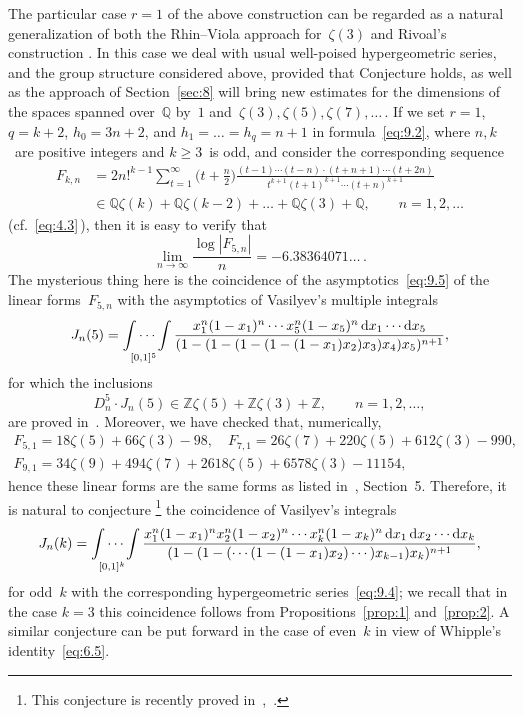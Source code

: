 \documentclass[a4paper,twoside]{article}
\numberwithin{equation}{section}
\renewcommand{\[}{\lfloor}
\renewcommand{\]}{\rfloor}
\newcommand{\<}{\langle}
\renewcommand{\>}{\rangle}
\renewcommand{\d}{\mathrm{d}}
\begin{document}
The particular case $r=1$ of the above construction
can be regarded as a natural generalization of both the Rhin--Viola
approach for~$\zeta(3)$ and Rivoal's construction \cite{Ri1}.
In this case we deal with usual well-poised hypergeometric series,
and the group structure considered above, provided that
Conjecture holds, as well as the approach of Section~\ref{sec:8}
will bring new estimates for the dimensions of the spaces
spanned over~$\mathbb Q$ by~$1$
and~$\zeta(3),\zeta(5),\zeta(7),\dots$\,.
If we set $r=1$, $q=k+2$, $h_0=3n+2$, and $h_1=\dots=h_q=n+1$
in formula~\eqref{eq:9.2}, where $n,k$~are positive
integers and $k\ge3$~is odd, and consider the corresponding
sequence
\begin{equation}
\begin{split}
F_{k,n}
&=2n!^{k-1}\sum_{t=1}^\infty\biggl(t+\frac n2\biggr)
\frac{(t-1)\dotsb(t-n)\cdot(t+n+1)\dotsb(t+2n)}
{t^{k+1}(t+1)^{k+1}\dotsb(t+n)^{k+1}}
\\
&\in\mathbb Q\zeta(k)+\mathbb Q\zeta(k-2)+\dots
+\mathbb Q\zeta(3)+\mathbb Q,
\qquad n=1,2,\dots
\end{split}
\label{eq:9.4}
\end{equation}
(cf.~\eqref{eq:4.3}\,), then it is easy to verify that
\begin{equation}
\lim_{n\to\infty}\frac{\log|F_{5,n}|}n
=-6.38364071\dots\,.
\label{eq:9.5}
\end{equation}
The mysterious thing here is the coincidence of the
asymptotics~\eqref{eq:9.5} of the linear forms~$F_{5,n}$
with the asymptotics of Vasilyev's multiple integrals
$$
J_n(5)=\idotsint\limits_{[0,1]^5}
\frac{x_1^n(1-x_1)^n\dotsb x_5^n(1-x_5)^n
\,\d x_1\dotsb\d x_5}
{(1-(1-(1-(1-(1-x_1)x_2)x_3)x_4)x_5)^{n+1}},
$$
for which the inclusions
$$
D_n^5\cdot J_n(5)\in\mathbb Z\zeta(5)+\mathbb Z\zeta(3)+\mathbb Z,
\qquad n=1,2,\dots,
$$
are proved in~\cite{Va}.
Moreover, we have checked that, numerically,
\begin{gather*}
F_{5,1}=18\zeta(5)+66\zeta(3)-98,
\quad
F_{7,1}=26\zeta(7)+220\zeta(5)+612\zeta(3)-990,
\\
F_{9,1}=34\zeta(9)+494\zeta(7)+2618\zeta(5)+6578\zeta(3)-11154,
\end{gather*}
hence these linear forms are the same forms
as listed in~\cite{Va}, Section~5.
Therefore, it is natural to conjecture%
\footnote{This conjecture is recently proved
in~\cite{Zu6},~\cite{Zu7}.}
the coincidence of Vasilyev's integrals
$$
J_n(k)=\idotsint\limits_{[0,1]^k}
\frac{x_1^n(1-x_1)^nx_2^n(1-x_2)^n\dotsb x_k^n(1-x_k)^n
\,\d x_1\,\d x_2\dotsb\d x_k}
{(1-(1-(\dotsb(1-(1-x_1)x_2)\dotsb)x_{k-1})x_k)^{n+1}},
$$
for odd~$k$
with the corresponding hypergeometric series~\eqref{eq:9.4};
we recall that in the case $k=3$
this coincidence follows from Propositions~\ref{prop:1} and~\ref{prop:2}.
A similar conjecture can be put forward in the case of even~$k$ in view
of Whipple's identity~\eqref{eq:6.5}.
\end{document}

